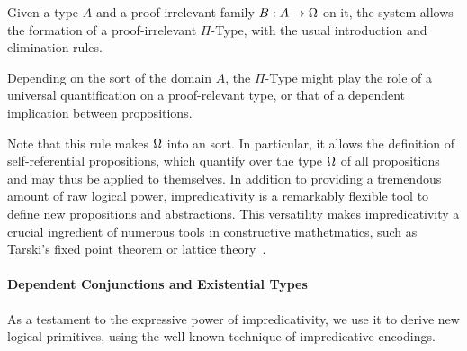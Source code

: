 Given a type \( A \) and a proof-irrelevant family \( B : A \to \Omega \)
on it, the system allows the formation of a proof-irrelevant \( \Pi \)-Type, 
with the usual introduction and elimination rules.
% 
% 
Depending on the sort of the domain \( A \), the \( \Pi \)-Type might play 
the role of a universal quantification on a proof-relevant type, or that of 
a dependent implication between propositions.

Note that this rule makes \( \Omega \) into an 
sort.
% 
In particular, it allows the definition of self-referential propositions,
which quantify over the type \( \Omega \) of all propositions and may thus
be applied to themselves.
%
In addition to providing a tremendous amount of raw logical power, 
impredicativity is a remarkably flexible tool to define new propositions and
abstractions.
% 
This versatility makes impredicativity a crucial ingredient of numerous 
tools in constructive mathetmatics, such as Tarski's fixed point theorem or 
lattice theory~.

\paragraph*{Dependent Conjunctions and Existential Types}
% 
As a testament to the expressive power of impredicativity, we use it to 
derive new logical primitives, using the well-known technique of impredicative 
encodings.

